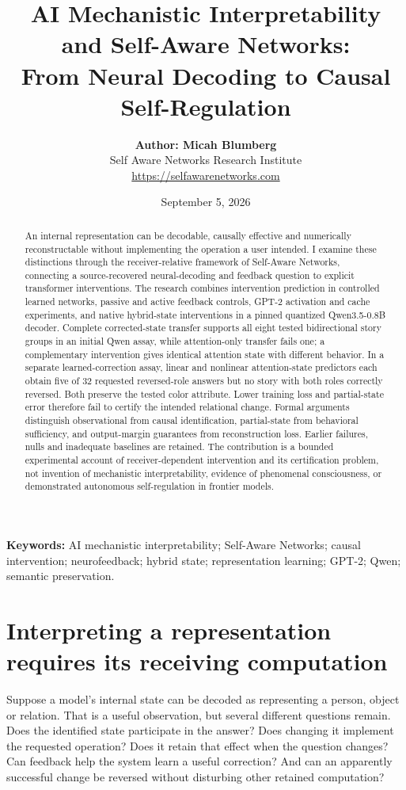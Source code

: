 \documentclass[11pt,letterpaper]{article}
\title{\bfseries AI Mechanistic Interpretability and Self-Aware Networks:\\[0.3em]\large From Neural Decoding to Causal Self-Regulation}
\author{%
{\small\textbf{Author: Micah Blumberg}}\\
{\small Self Aware Networks Research Institute}\\
{\small\url{https://selfawarenetworks.com}}%
}
\date{\small September 5, 2026}
\begin{document}
\maketitle

\begin{abstract}

An internal representation can be decodable, causally effective and numerically reconstructable without implementing the operation a user intended. I examine these distinctions through the receiver-relative framework of Self-Aware Networks, connecting a source-recovered neural-decoding and feedback question to explicit transformer interventions. The research combines intervention prediction in controlled learned networks, passive and active feedback controls, GPT-2 activation and cache experiments, and native hybrid-state interventions in a pinned quantized Qwen3.5-0.8B decoder. Complete corrected-state transfer supports all eight tested bidirectional story groups in an initial Qwen assay, while attention-only transfer fails one; a complementary intervention gives identical attention state with different behavior. In a separate learned-correction assay, linear and nonlinear attention-state predictors each obtain five of 32 requested reversed-role answers but no story with both roles correctly reversed. Both preserve the tested color attribute. Lower training loss and partial-state error therefore fail to certify the intended relational change. Formal arguments distinguish observational from causal identification, partial-state from behavioral sufficiency, and output-margin guarantees from reconstruction loss. Earlier failures, nulls and inadequate baselines are retained. The contribution is a bounded experimental account of receiver-dependent intervention and its certification problem, not invention of mechanistic interpretability, evidence of phenomenal consciousness, or demonstrated autonomous self-regulation in frontier models.

\end{abstract}
\noindent\textbf{Keywords:} AI mechanistic interpretability; Self-Aware Networks; causal intervention; neurofeedback; hybrid state; representation learning; GPT-2; Qwen; semantic preservation.

\section{Interpreting a representation requires its receiving computation}

Suppose a model's internal state can be decoded as representing a person, object or relation. That is a useful observation, but several different questions remain. Does the identified state participate in the answer? Does changing it implement the requested operation? Does it retain that effect when the question changes? Can feedback help the system learn a useful correction? And can an apparently successful change be reversed without disturbing other retained computation?
\end{document}
